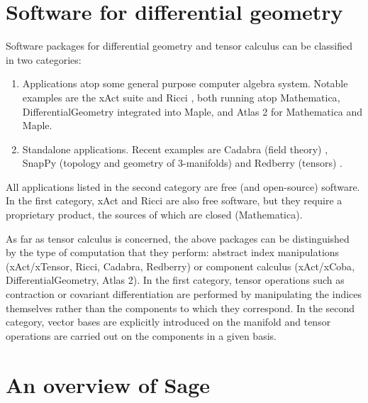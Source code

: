 \documentclass[a4paper]{jpconf}
\newcommand{\soft}[1]{\textsf{#1}}
\begin{document}

\section{Software for differential geometry}

Software packages for differential geometry and tensor calculus can be 
classified in two categories: 
\begin{enumerate}
\item Applications atop some general purpose computer algebra system. 
Notable examples are 
the \soft{xAct} suite \cite{Marti08,xAct} and \soft{Ricci} \cite{Ricci}, both
running atop \soft{Mathematica},
\soft{DifferentialGeometry} \cite{AnderT12,DiffGeom} integrated into \soft{Maple}, and \soft{Atlas 2}
\cite{Atlas2} for \soft{Mathematica} and \soft{Maple}.
\item Standalone applications. Recent examples are \soft{Cadabra}  (field theory) \cite{Peete07,Cadabra},
\soft{SnapPy} (topology and geometry of 3-manifolds) \cite{SnapPy} and
\soft{Redberry} (tensors) \cite{BolotP13,Redberry}.
\end{enumerate}
All applications listed in the second category are free (and open-source) software. In
the first category, \soft{xAct} and \soft{Ricci} are also free software, but
they require a proprietary product, the sources of which are closed (\soft{Mathematica}).

As far as tensor calculus is concerned, the above packages can be distinguished by 
the type of computation that they perform: abstract index manipulations 
(\soft{xAct/xTensor}, \soft{Ricci}, \soft{Cadabra}, \soft{Redberry})
or component calculus (\soft{xAct/xCoba}, \soft{DifferentialGeometry},
\soft{Atlas 2}). 
In the first category, tensor operations such as contraction or covariant differentiation 
are performed by manipulating the indices themselves rather than the components 
to which they correspond. In the second category, vector bases are explicitly 
introduced on the manifold and tensor operations are carried out on the components 
in a given basis.



\section{An overview of Sage}
\end{document}
